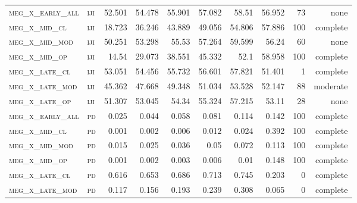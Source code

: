 \begin{landscape}
\begin{center}
\begin{footnotesize}
\begin{longtable}{llrrrrr|rrr}
\textsc{meg\_x\_early\_all} & \textsc{iji       }    & 52.501   & 54.478   & 55.901   & 57.082   & 58.51     & 56.952        & 73            & none              \\
\textsc{meg\_x\_mid\_cl   } & \textsc{iji       }    & 18.723   & 36.246   & 43.889   & 49.056   & 54.806    & 57.886        & 100           & complete             \\
\textsc{meg\_x\_mid\_mod  } & \textsc{iji       }    & 50.251   & 53.298   & 55.53    & 57.264   & 59.599    & 56.24         & 60            & none              \\
\textsc{meg\_x\_mid\_op   } & \textsc{iji       }    & 14.54    & 29.073   & 38.551   & 45.332   & 52.1      & 58.958        & 100           & complete             \\
\textsc{meg\_x\_late\_cl  } & \textsc{iji       }    & 53.051   & 54.456   & 55.732   & 56.601   & 57.821    & 51.401        & 1             & complete             \\
\textsc{meg\_x\_late\_mod } & \textsc{iji       }    & 45.362   & 47.668   & 49.348   & 51.034   & 53.528    & 52.147        & 88            & moderate              \\
\textsc{meg\_x\_late\_op  } & \textsc{iji       }    & 51.307   & 53.045   & 54.34    & 55.324   & 57.215    & 53.11         & 28            & none             \\
\textsc{meg\_x\_early\_all} & \textsc{pd        }    & 0.025    & 0.044    & 0.058    & 0.081    & 0.114     & 0.142         & 100           & complete             \\
\textsc{meg\_x\_mid\_cl   } & \textsc{pd        }    & 0.001    & 0.002    & 0.006    & 0.012    & 0.024     & 0.392         & 100           & complete             \\
\textsc{meg\_x\_mid\_mod  } & \textsc{pd        }    & 0.015    & 0.025    & 0.036    & 0.05     & 0.072     & 0.113         & 100           & complete             \\
\textsc{meg\_x\_mid\_op   } & \textsc{pd        }    & 0.001    & 0.002    & 0.003    & 0.006    & 0.01      & 0.148         & 100           & complete             \\
\textsc{meg\_x\_late\_cl  } & \textsc{pd        }    & 0.616    & 0.653    & 0.686    & 0.713    & 0.745     & 0.203         & 0             & complete            \\
\textsc{meg\_x\_late\_mod } & \textsc{pd        }    & 0.117    & 0.156    & 0.193    & 0.239    & 0.308     & 0.065         & 0             & complete            \\

\end{longtable}
\end{footnotesize}
\end{center}
\end{landscape}
